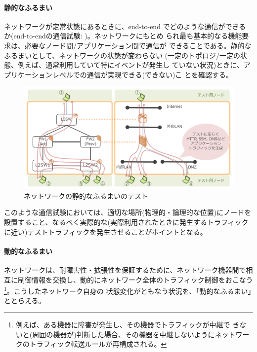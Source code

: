    \paragraph{静的なふるまい}
ネットワークが定常状態にあるときに、end-to-end でどのような通信ができる
か(end-to-endの通信試験: )。ネットワークにもとめ
られ最も基本的なる機能要求は、必要なノード間/アプリケーション間で通信が
できることである。静的なふるまいとして、ネットワークの状態が変わらない
(一定のトポロジ/一定の状態、例えば、通常利用していて特にイベントが発生し
ていない状況)ときに、アプリケーションレベルでの通信が実現できる(できない)こ
とを確認する。
\begin{figure}[h]
 \centering
 \includegraphics[scale=0.5]{img/test-static.png}
 \caption{ネットワークの静的なふるまいのテスト}
 \label{fig:test-static}
\end{figure}

このような通信試験においては、適切な場所(物理的・論理的な位置)にノードを
設置すること、なるべく実際的な(実際利用されたときに発生するトラフィック
に近い)テストトラフィックを発生させることがポイントとなる。

    \paragraph{動的なふるまい}
ネットワークは、耐障害性・拡張性を保証するために、ネットワーク機器間で相
互に制御情報を交換し、動的にネットワーク全体のトラフィック制御をおこなう
\footnote{例えば、ある機器に障害が発生し、その機器でトラフィックが中継で
きないと(周囲の機器が)判断した場合、その機器を中継しないようにネットワー
クのトラフィック転送ルールが再構成される。}。こうしたネットワーク自身の
状態変化がともなう状況を、「動的なふるまい」ととらえる。

